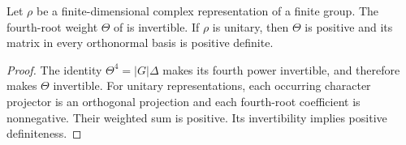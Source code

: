 \begin{lemma}
    \label{thm:peps_representation_theta_positive}
    \leanok
    Let $\rho$ be a finite-dimensional complex representation of a finite
    group. The fourth-root weight $\Theta$ of \cite[Section~7]{Schuch2010PEPS}
    is invertible. If $\rho$ is unitary, then $\Theta$ is positive and its
    matrix in every orthonormal basis is positive definite.
\end{lemma}
\begin{proof}\leanok
    The identity $\Theta^4=|G|\Delta$ makes its fourth power invertible,
    and therefore makes $\Theta$ invertible. For unitary representations,
    each occurring character projector is an orthogonal projection and
    each fourth-root coefficient is nonnegative. Their weighted sum is
    positive. Its invertibility implies positive definiteness.
\end{proof}
